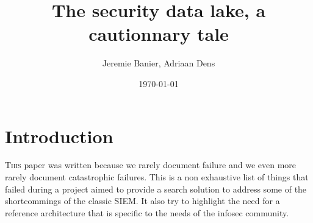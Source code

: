 \documentclass[a4paper,12pt]{article}
\begin{document}
\title{The security data lake, a cautionnary tale}
\author{Jeremie Banier, Adriaan Dens}
\date{\today}
\maketitle
\newpage
\tableofcontents
\newpage
\section{Introduction}
\lettrine{T}{his} paper was written because we rarely document failure and we even more rarely document 
catastrophic failures. This is a non exhaustive list of things that failed during a project aimed 
to provide a search solution to address some of the shortcommings of the classic SIEM.
It also try to highlight the need for a reference architecture that is specific to the needs of the infosec community.
\end{document}
